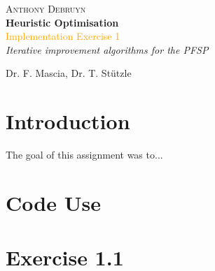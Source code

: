\newcommand*{\titleTH}{\begingroup %
\raggedleft %
\vspace*{\baselineskip} %

{\Large \textsc{Anthony Debruyn}}\\[0.167\textheight] %

{\LARGE\bfseries Heuristic Optimisation}\\[\baselineskip] %

{\textcolor{Orange}{\Huge Implementation Exercise 1}}\\[\baselineskip] %

{\Large \textit{Iterative improvement algorithms for the PFSP}}\par %

\vfill %


{\large Dr. F. Mascia, Dr. T. Stützle \course}\par %

\endgroup}


 

\thispagestyle{empty}

\titleTH %

\newpage

\section{Introduction}
The goal of this assignment was to...

\section{Code Use}


\section{Exercise 1.1}

